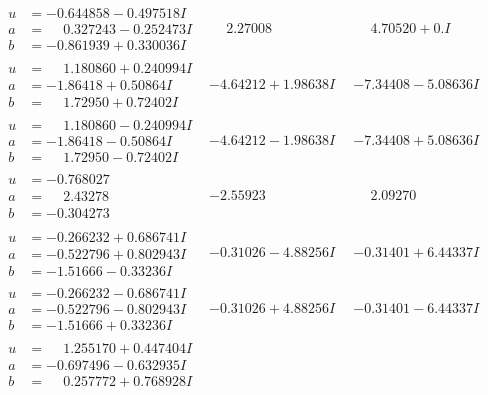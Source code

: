 \documentclass[1p]{elsarticle_modified}
\theoremstyle{definition}
\begin{document}
$$\begin{array}{c|c|c}
\begin{aligned}
u &= -0.644858 - 0.497518 I \\
a &= \phantom{-}0.327243 - 0.252473 I \\
b &= -0.861939 + 0.330036 I\end{aligned}
 & \phantom{-}2.27008\phantom{ +0.000000I} & \phantom{-}4.70520 + 0. I\phantom{ +0.000000I} \\ \hline\begin{aligned}
u &= \phantom{-}1.180860 + 0.240994 I \\
a &= -1.86418 + 0.50864 I \\
b &= \phantom{-}1.72950 + 0.72402 I\end{aligned}
 & -4.64212 + 1.98638 I & -7.34408 - 5.08636 I \\ \hline\begin{aligned}
u &= \phantom{-}1.180860 - 0.240994 I \\
a &= -1.86418 - 0.50864 I \\
b &= \phantom{-}1.72950 - 0.72402 I\end{aligned}
 & -4.64212 - 1.98638 I & -7.34408 + 5.08636 I \\ \hline\begin{aligned}
u &= -0.768027\phantom{ +0.000000I} \\
a &= \phantom{-}2.43278\phantom{ +0.000000I} \\
b &= -0.304273\phantom{ +0.000000I}\end{aligned}
 & -2.55923\phantom{ +0.000000I} & \phantom{-}2.09270\phantom{ +0.000000I} \\ \hline\begin{aligned}
u &= -0.266232 + 0.686741 I \\
a &= -0.522796 + 0.802943 I \\
b &= -1.51666 - 0.33236 I\end{aligned}
 & -0.31026 - 4.88256 I & -0.31401 + 6.44337 I \\ \hline\begin{aligned}
u &= -0.266232 - 0.686741 I \\
a &= -0.522796 - 0.802943 I \\
b &= -1.51666 + 0.33236 I\end{aligned}
 & -0.31026 + 4.88256 I & -0.31401 - 6.44337 I \\ \hline\begin{aligned}
u &= \phantom{-}1.255170 + 0.447404 I \\
a &= -0.697496 - 0.632935 I \\
b &= \phantom{-}0.257772 + 0.768928 I\end{aligned}

\end{array}$$
\end{document}
